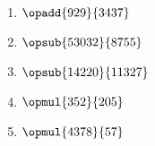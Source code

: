\exo{}

\begin{multicols}{2}
\begin{enumerate}[itemsep=4em]
	
	\item $\opadd{929}{3437}$
	\item $\opsub{53032}{8755}$
	\item $\opsub{14220}{11327}$
	\item $\opmul{352}{205}$
	\item $\opmul{4378}{57}$\\

\end{enumerate}
\end{multicols}